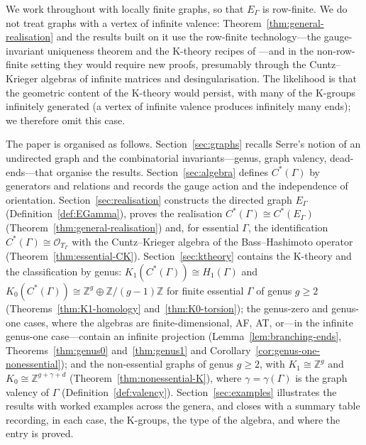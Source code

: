 \documentclass[12pt,reqno]{amsart}
\theoremstyle{plain}
\theoremstyle{definition}
\newcommand{\Z}{\mathbb{Z}}
\newcommand{\Ot}{\mathcal{O}}
\begin{document}
We work throughout with locally finite graphs, so that $E_\Gamma$ is row-finite. We do not treat
graphs with a vertex of infinite valence: Theorem~\ref{thm:general-realisation} and the results
built on it use the row-finite technology---the gauge-invariant uniqueness theorem and the
K-theory recipes of \cite{RS}---and in the non-row-finite setting they would require new proofs,
presumably through the Cuntz--Krieger algebras of infinite matrices and desingularisation. The
likelihood is that the geometric content of the K-theory would persist, with many of the K-groups
infinitely generated \textup(a vertex of infinite valence produces infinitely many ends\textup);
we therefore omit this case.

The paper is organised as follows. Section~\ref{sec:graphs} recalls Serre's notion of an
undirected graph and the combinatorial invariants---genus, graph valency, dead-ends---that
organise the results. Section~\ref{sec:algebra} defines $C^*(\Gamma)$ by generators and relations
and records the gauge action and the independence of orientation. Section~\ref{sec:realisation}
constructs the directed graph $E_\Gamma$ \textup(Definition~\ref{def:EGamma}\textup), proves the
realisation $C^*(\Gamma)\cong C^*(E_\Gamma)$ \textup(Theorem~\ref{thm:general-realisation}\textup)
and, for essential $\Gamma$, the identification $C^*(\Gamma)\cong\Ot_{T_\Gamma}$ with the
Cuntz--Krieger algebra of the Bass--Hashimoto operator
\textup(Theorem~\ref{thm:essential-CK}\textup). Section~\ref{sec:ktheory} contains the K-theory
and the classification by genus: $K_1(C^*(\Gamma))\cong H_1(\Gamma)$ and
$K_0(C^*(\Gamma))\cong\Z^{g}\oplus\Z/(g-1)\Z$ for finite essential $\Gamma$ of genus $g\ge 2$
\textup(Theorems~\ref{thm:K1-homology} and~\ref{thm:K0-torsion}\textup); the genus-zero and
genus-one cases, where the algebras are finite-dimensional, AF, AT, or---in the infinite genus-one
case---contain an infinite projection \textup(Lemma~\ref{lem:branching-ends},
Theorems~\ref{thm:genus0} and~\ref{thm:genus1} and Corollary~\ref{cor:genus-one-nonessential}\textup); and the
non-essential graphs of genus $g\ge 2$, with $K_1\cong\Z^{g}$ and $K_0\cong\Z^{g+\gamma+d}$
\textup(Theorem~\ref{thm:nonessential-K}\textup), where $\gamma=\gamma(\Gamma)$ is the graph
valency of $\Gamma$ \textup(Definition~\ref{def:valency}\textup). Section~\ref{sec:examples}
illustrates the results with worked examples across the genera, and closes with a summary table
recording, in each case, the K-groups, the type of the algebra, and where the entry is proved.
\end{document}
